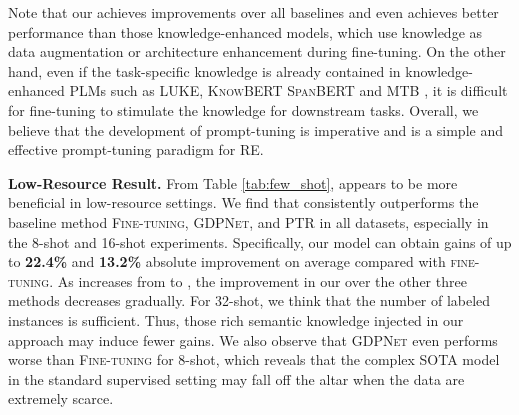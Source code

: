 \documentclass[sigconf]{acmart}
\begin{document}
Note that our {\ours} achieves improvements over all baselines and even achieves better performance than those knowledge-enhanced models,  which use knowledge as data augmentation or architecture enhancement during fine-tuning.
On the other hand,
even if the task-specific knowledge is already contained in knowledge-enhanced PLMs such as 
\textsc{LUKE}, \textsc{KnowBERT} \textsc{SpanBERT} and \textsc{MTB}
, it is difficult for fine-tuning to stimulate the knowledge for downstream tasks.
Overall, we believe that the development of prompt-tuning is imperative and 
{\ours} is a simple and effective prompt-tuning paradigm for RE.



\textbf{Low-Resource Result.}
From Table \ref{tab:few_shot},  {\ours} appears to be more beneficial in low-resource settings. 
We find that {\ours} consistently outperforms the baseline method \textsc{Fine-tuning}, \textsc{GDPNet}, and  \textsc{PTR} in all datasets, especially in the 8-shot and 16-shot experiments. 
Specifically, our model can obtain gains of up to \textbf{22.4\%} and \textbf{13.2\%}  absolute improvement on average compared with \textsc{fine-tuning}.
As  increases from  to , the improvement in our {\ours} over the other three methods decreases gradually.
For 32-shot, we think that the number of labeled instances is sufficient. 
Thus, those rich semantic knowledge injected in our approach may induce fewer gains. 
We also observe that \textsc{GDPNet} even performs worse than \textsc{Fine-tuning} for 8-shot, which reveals that the complex SOTA model in the standard supervised setting may fall off the altar when the data are extremely scarce. 
\end{document}
